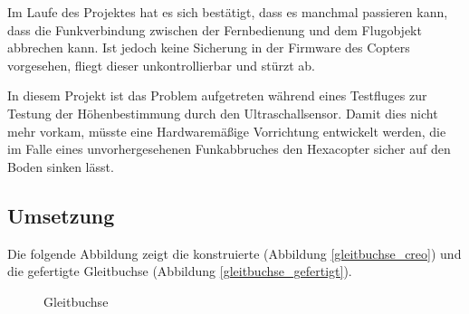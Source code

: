 	Im Laufe des Projektes hat es sich bestätigt, dass es manchmal passieren kann, dass die Funkverbindung zwischen der Fernbedienung und dem Flugobjekt abbrechen kann.
	Ist jedoch keine Sicherung in der Firmware des Copters vorgesehen, fliegt dieser unkontrollierbar und stürzt ab.

	In diesem Projekt ist das Problem aufgetreten während eines Testfluges zur Testung der Höhenbestimmung durch den Ultraschallsensor.
	Damit dies nicht mehr vorkam, müsste eine Hardwaremäßige Vorrichtung entwickelt werden, die im Falle eines unvorhergesehenen Funkabbruches den Hexacopter sicher auf den Boden sinken lässt.

	\subsection{Umsetzung}

	Die folgende Abbildung zeigt die konstruierte (Abbildung \ref{gleitbuchse_creo}) und die gefertigte Gleitbuchse (Abbildung \ref{gleitbuchse_gefertigt}).

			\begin{figure}[tbh]
				\begin{centering}
				\par\end{centering}
				\caption{Gleitbuchse}
				\label{Gleitbuchse}
			\end{figure}

